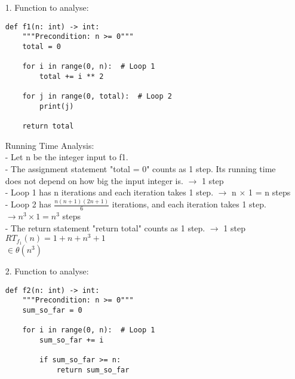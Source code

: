 \documentclass[11pt]{article}
\begin{document}
\begin{enumerate}
\item[1.]
Function to analyse:

\begin{verbatim}
def f1(n: int) -> int:
    """Precondition: n >= 0"""
    total = 0

    for i in range(0, n):  # Loop 1
        total += i ** 2

    for j in range(0, total):  # Loop 2
        print(j)

    return total
\end{verbatim}
Running Time Analysis: \\
- Let n be the integer input to f1. \\
- The assignment statement "total = 0" counts as 1 step. Its running time does not depend on how big the input integer is. $\rightarrow$ 1 step \\
- Loop 1 has n iterations and each iteration takes 1 step. $\rightarrow$ n $\times$ 1 = n steps \\
- Loop 2 has $\frac{n(n+1)(2n+1)}{6}$ iterations, and each iteration takes 1 step. $\rightarrow n^3 \times 1 = n^3$ steps \\
- The return statement "return total" counts as 1 step. $\rightarrow$ 1 step \\
$RT_f_1(n) = 1 + n + n^3 + 1$ \\
$\in \theta (n^3)$



\newpage


\item[2.]
Function to analyse:

\begin{verbatim}
def f2(n: int) -> int:
    """Precondition: n >= 0"""
    sum_so_far = 0

    for i in range(0, n):  # Loop 1
        sum_so_far += i

        if sum_so_far >= n:
            return sum_so_far


\end{verbatim}
\end{enumerate}
\end{document}
